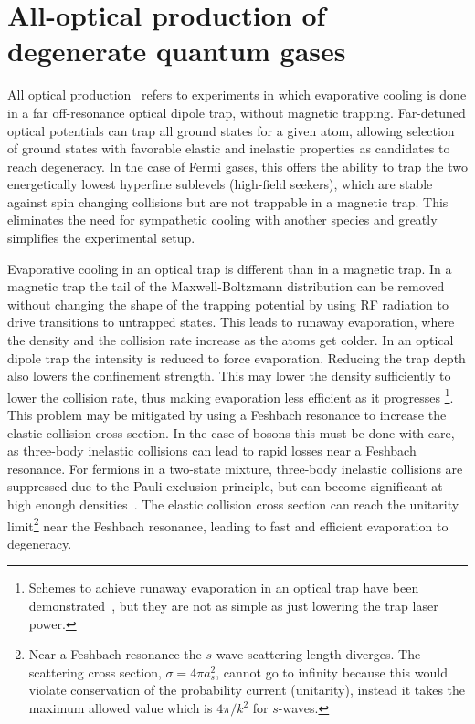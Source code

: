 \documentclass[oneside,12pt]{memoir}
\begin{document}
\section{All-optical production of degenerate quantum gases} 

All optical
production~\cite{Chapman2001,Granade2002,O'Hara2002,Weber2003,Jochim2003}
refers to experiments in which evaporative cooling is done in a far
off-resonance optical dipole trap, without magnetic trapping. Far-detuned
optical potentials can trap all ground states for a given atom, allowing
selection of ground states with favorable elastic and inelastic properties as
candidates to reach degeneracy.  In the case of Fermi gases, this offers the
ability to trap the two energetically lowest hyperfine sublevels (high-field
seekers), which are stable against spin changing collisions but are not
trappable in a magnetic trap.  This eliminates the need for sympathetic cooling
with another species and greatly simplifies the experimental setup.

Evaporative cooling in an optical trap is different than in a magnetic trap. In
a magnetic trap the tail of the Maxwell-Boltzmann distribution can be removed
without changing the shape of the trapping potential by using RF radiation to
drive transitions to untrapped states.  This leads to runaway evaporation,
where the density and the collision rate increase as the atoms get colder.  In
an optical dipole trap the intensity is reduced to force evaporation.  Reducing
the trap depth also lowers the confinement strength. This may lower the density
sufficiently to lower the collision rate, thus making evaporation less
efficient as it progresses \footnote{ Schemes to achieve runaway evaporation in
an optical trap have been demonstrated~\cite{Chin2008,Bouyer2009}, but they are
not as simple as just lowering the trap laser power.}.  This problem may be
mitigated by using a Feshbach resonance to increase the elastic collision cross
section.  In the case of bosons this must be done with care, as three-body
inelastic collisions can lead to rapid losses near a Feshbach resonance. For
fermions in a two-state mixture, three-body inelastic collisions are suppressed
due to the Pauli exclusion principle, but can become significant at high enough
densities~\cite{Du2009}.  The elastic collision cross section can reach the
unitarity limit\footnote{Near a Feshbach resonance the $s$-wave scattering
length diverges.  The scattering cross section, $\sigma=4\pi a_{s}^{2}$, cannot
go to infinity because this would violate conservation of the probability
current (unitarity), instead it takes the maximum allowed value which is
$4\pi/k^{2}$ for $s$-waves.} near the Feshbach resonance, leading to fast and
efficient evaporation to degeneracy.  
\end{document}

